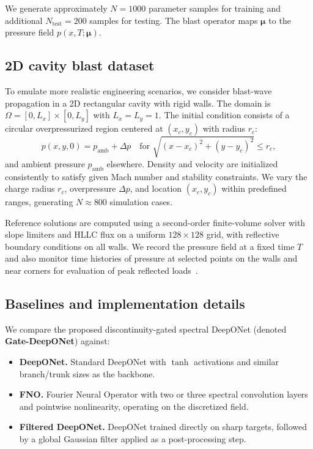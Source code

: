 \documentclass[a4paper,fleqn]{cas-dc}
\begin{document}
We generate approximately $N=1000$ parameter samples for training and additional $N_\mathrm{test}=200$ samples for testing.
The blast operator maps $\boldsymbol{\mu}$ to the pressure field $p(x,T;\boldsymbol{\mu})$.

\subsection{2D cavity blast dataset}

To emulate more realistic engineering scenarios, we consider blast-wave propagation in a 2D rectangular cavity with rigid walls.
The domain is $\Omega=[0,L_x]\times[0,L_y]$ with $L_x=L_y=1$.
The initial condition consists of a circular overpressurized region centered at $(x_c,y_c)$ with radius $r_c$:
\begin{equation}
  p(x,y,0) = p_\mathrm{amb} + \Delta p
  \quad \text{for } \sqrt{(x-x_c)^2 + (y-y_c)^2} \le r_c,
\end{equation}
and ambient pressure $p_\mathrm{amb}$ elsewhere.
Density and velocity are initialized consistently to satisfy given Mach number and stability constraints.
We vary the charge radius $r_c$, overpressure $\Delta p$, and location $(x_c,y_c)$ within predefined ranges, generating $N\approx 800$ simulation cases.

Reference solutions are computed using a second-order finite-volume solver with slope limiters and HLLC flux on a uniform $128\times128$ grid, with reflective boundary conditions on all walls.
We record the pressure field at a fixed time $T$ and also monitor time histories of pressure at selected points on the walls and near corners for evaluation of peak reflected loads~\citep{Neuberger2015BlastCFD}.

\subsection{Baselines and implementation details}

We compare the proposed discontinuity-gated spectral DeepONet (denoted \textbf{Gate-DeepONet}) against:

\begin{itemize}[leftmargin=*]
  \item \textbf{DeepONet.} Standard DeepONet with $\tanh$ activations and similar branch/trunk sizes as the backbone.
  \item \textbf{FNO.} Fourier Neural Operator with two or three spectral convolution layers and pointwise nonlinearity, operating on the discretized field.
  \item \textbf{Filtered DeepONet.} DeepONet trained directly on sharp targets, followed by a global Gaussian filter applied as a post-processing step.
\end{itemize}
\end{document}
